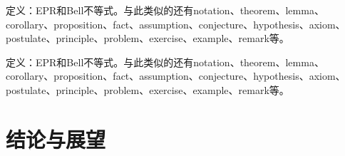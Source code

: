\begin{definition}
定义：EPR和Bell不等式。与此类似的还有notation、theorem、lemma、corollary、proposition、fact、assumption、conjecture、hypothesis、axiom、postulate、principle、problem、exercise、example、remark等。
\end{definition}
\begin{theorem}
定义：EPR和Bell不等式。与此类似的还有notation、theorem、lemma、corollary、proposition、fact、assumption、conjecture、hypothesis、axiom、postulate、principle、problem、exercise、example、remark等。
\end{theorem}




\section{结论与展望}




\backmatter 

\begin{acknowledgment}%

\end{acknowledgment}






  